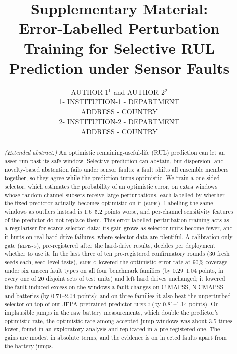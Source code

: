 \documentclass{esannV2}
\newcommand{\RPT}{\textsc{elpis}}
\newcommand{\AUTOD}{\textsc{elpis-g}}
\newcommand{\EJ}{\textsc{elpis-j}}
\begin{document}
\title{Supplementary Material:\\ Error-Labelled Perturbation Training for Selective RUL Prediction under Sensor Faults}
\author{AUTHOR-1$^1$ and AUTHOR-2$^2$
\vspace{.3cm}\\
1- INSTITUTION-1 - DEPARTMENT \\ ADDRESS - COUNTRY
\vspace{.1cm}\\
2- INSTITUTION-2 - DEPARTMENT \\ ADDRESS - COUNTRY\\
}
\maketitle
\noindent{}

\begin{abstract}\textit{(Extended abstract.)} 
An optimistic remaining-useful-life (RUL) prediction can let an asset run past its safe window. Selective prediction can abstain, but dispersion- and novelty-based abstention fails under sensor faults: a fault shifts all ensemble members together, so they agree while the prediction turns optimistic. We train a one-sided selector, which estimates the probability of an optimistic error, on extra windows whose random channel subsets receive large perturbations, each labelled by whether the fixed predictor actually becomes optimistic on it (\RPT). Labelling the same windows as outliers instead is 1.6--5.2 points worse, and per-channel sensitivity features of the predictor do not replace them. This error-labelled perturbation training acts as a regulariser for scarce selector data: its gain grows as selector units become fewer, and it hurts on real hard-drive failures, where selector data are plentiful. A calibration-only gate (\AUTOD), pre-registered after the hard-drive results, decides per deployment whether to use it. In the last three of ten pre-registered confirmatory rounds (30 fresh seeds each, seed-level tests), \AUTOD{} lowered the optimistic-error rate at 90\% coverage under six unseen fault types on all four benchmark families (by 0.29--1.04 points, in every one of 20 disjoint sets of test units) and left hard drives unchanged; it lowered the fault-induced excess on the windows a fault changes on C-MAPSS, N-CMAPSS and batteries (by 0.71--2.04 points); and on three families it also beat the unperturbed selector on top of our JEPA-pretrained predictor \EJ{} (by 0.81--1.14 points). On implausible jumps in the raw battery measurements, which double the predictor's optimistic rate, the optimistic rate among accepted jump windows was about 3.5 times lower, found in an exploratory analysis and replicated in a pre-registered one. The gains are modest in absolute terms, and the evidence is on injected faults apart from the battery jumps.
\end{abstract}
\end{document}
